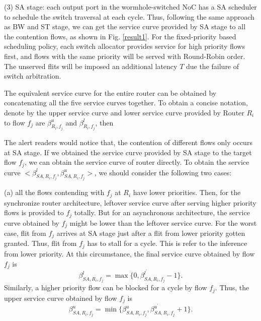 \documentclass[10pt,journal]{IEEEtran}
\begin{document}
(3) SA stage: each output port in the wormhole-switched NoC has a SA scheduler to schedule the switch traversal at each cycle. Thus, following the same approach as BW and ST stage, we can get the service curve provided by SA stage to all the contention flows, as shown in Fig. \ref{result1}. For the fixed-priority based scheduling policy, each switch allocator provides service for high priority flows first, and flows with the same priority will be served with Round-Robin order. The unserved flits will be imposed an additional latency $T$ due the failure of switch arbitration.

The equivalent service curve for the entire router can be obtained by concatenating all the five service curves together. To obtain a concise notation, denote by the upper service curve and lower service curve provided by Router $R_i$ to flow $f_j$ are $\beta_{R_i,f_j}^u$ and $\beta_{R_i,f_j}^l$, then

The alert readers would notice that, the contention of different flows only occurs at SA stage. If we obtained the service curve provided by SA stage to the target flow $f_j$, we can obtain the service curve of router directly. To obtain the service curve $<\beta_{SA,R_i,f_j}^l,\beta_{SA,R_i,f_j}^u>$, we should consider the following two cases:

(a) all the flows contending with $f_j$ at $R_i$ have lower priorities. Then, for the synchronize router architecture, leftover service curve after serving higher priority flows is provided to $f_j$ totally. But for an asynchronous architecture, the service curve obtained by $f_j$ might be lower than the leftover service curve. For the worst case, flit from $f_j$ arrives at SA stage just after a flit from lower priority gotten granted. Thus, flit from $f_j$ has to stall for a cycle. This is refer to the inference from lower priority. At this circumstance, the final service curve obtained by flow $f_j$ is
\begin{equation}\label{nonpreemptbetal}
\beta^{l}_{SA,R_i,f_j}=\max\{0,\beta^{l^\prime}_{SA,R_i,f_j}-1\}.
\end{equation}
Similarly, a higher priority flow can be blocked for a cycle by flow $f_j$. Thus, the upper service curve obtained by flow $f_j$ is
\begin{equation}\label{nonpreemptbetau}
\beta^{u}_{SA,R_i,f_j}=\min\{\beta^{u}_{SA,R_i,f_j},\beta^{u^\prime}_{SA,R_i,f_j}+1\}.
\end{equation}
\end{document}
